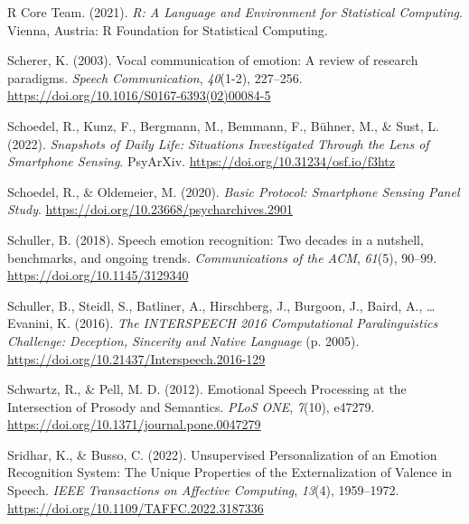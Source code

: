 \documentclass[
  english,
  man,floatsintext]{apa6}
\newlength{\cslhangindent}
\newenvironment{CSLReferences}[2] %
 {%
  \setlength{\parindent}{0pt}
  \ifodd #1 \everypar{\setlength{\hangindent}{\cslhangindent}}\ignorespaces\fi
  \ifnum #2 > 0
  \setlength{\parskip}{#2\baselineskip}
  \fi
 }%
 {}
\begin{document}
\begin{CSLReferences}{1}{0}
\leavevmode{}%
R Core Team. (2021). \emph{R: {A Language} and {Environment} for {Statistical Computing}}. Vienna, Austria: R Foundation for Statistical Computing.

\leavevmode{}%
Scherer, K. (2003). Vocal communication of emotion: {A} review of research paradigms. \emph{Speech Communication}, \emph{40}(1-2), 227--256. \url{https://doi.org/10.1016/S0167-6393(02)00084-5}

\leavevmode{}%
Schoedel, R., Kunz, F., Bergmann, M., Bemmann, F., Bühner, M., \& Sust, L. (2022). \emph{Snapshots of {Daily Life}: {Situations Investigated Through} the {Lens} of {Smartphone Sensing}}. PsyArXiv. \url{https://doi.org/10.31234/osf.io/f3htz}

\leavevmode{}%
Schoedel, R., \& Oldemeier, M. (2020). \emph{Basic {Protocol}: {Smartphone Sensing Panel Study}}. \url{https://doi.org/10.23668/psycharchives.2901}

\leavevmode{}%
Schuller, B. (2018). Speech emotion recognition: Two decades in a nutshell, benchmarks, and ongoing trends. \emph{Communications of the ACM}, \emph{61}(5), 90--99. \url{https://doi.org/10.1145/3129340}

\leavevmode{}%
Schuller, B., Steidl, S., Batliner, A., Hirschberg, J., Burgoon, J., Baird, A., \ldots{} Evanini, K. (2016). \emph{The {INTERSPEECH} 2016 {Computational Paralinguistics Challenge}: {Deception}, {Sincerity} and {Native Language}} (p. 2005). \url{https://doi.org/10.21437/Interspeech.2016-129}

\leavevmode{}%
Schwartz, R., \& Pell, M. D. (2012). Emotional {Speech Processing} at the {Intersection} of {Prosody} and {Semantics}. \emph{PLoS ONE}, \emph{7}(10), e47279. \url{https://doi.org/10.1371/journal.pone.0047279}

\leavevmode{}%
Sridhar, K., \& Busso, C. (2022). Unsupervised {Personalization} of an {Emotion Recognition System}: {The Unique Properties} of the {Externalization} of {Valence} in {Speech}. \emph{IEEE Transactions on Affective Computing}, \emph{13}(4), 1959--1972. \url{https://doi.org/10.1109/TAFFC.2022.3187336}


\end{CSLReferences}
\end{document}
